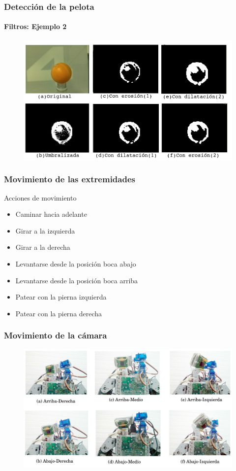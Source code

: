 \documentclass{beamer}
\begin{document}
\begin{frame}
\frametitle{Detecci\'on de la pelota}
\framesubtitle{Filtros: Ejemplo 2}

\begin{figure}[hbtp]
\centering
\includegraphics[scale=0.3]{conTodos4.png} 
\end{figure}

\end{frame}


\begin{frame}
\frametitle{Movimiento de las extremidades}

\begin{block}{Acciones de movimiento}
	\begin{itemize}
	\item Caminar hacia adelante
	\item Girar a la izquierda
	\item Girar a la derecha
	\item Levantarse desde la posición boca abajo
	\item Levantarse desde la posición boca arriba
	\item Patear con la pierna izquierda
	\item Patear con la pierna derecha
    \end{itemize}		
\end{block}

\end{frame}


\begin{frame}
\frametitle{Movimiento de la c\'amara}
\begin{figure}[hbtp]
\centering
\includegraphics[scale=0.09]{posicionesCamara.jpg} 
\end{figure}
\end{frame}
\end{document}
